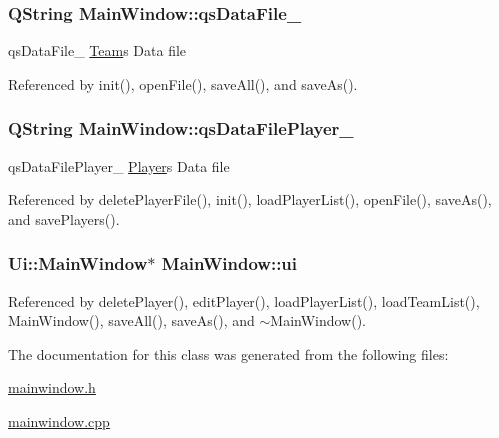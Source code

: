 \subsubsection[{qs\+Data\+File\+\_\+}]{\setlength{\rightskip}{0pt plus 5cm}Q\+String Main\+Window\+::qs\+Data\+File\+\_\+\hspace{0.3cm}{\ttfamily [private]}}\label{class_main_window_accae73696fc981f52f13a1e51b411ccb}


qs\+Data\+File\+\_\+ \hyperlink{class_team}{Team}\textquotesingle{}s Data file 



Referenced by init(), open\+File(), save\+All(), and save\+As().

\hypertarget{class_main_window_aa4336777565d0c2a9ad6f0b96bc4c004}{}
\subsubsection[{qs\+Data\+File\+Player\+\_\+}]{\setlength{\rightskip}{0pt plus 5cm}Q\+String Main\+Window\+::qs\+Data\+File\+Player\+\_\+\hspace{0.3cm}{\ttfamily [private]}}\label{class_main_window_aa4336777565d0c2a9ad6f0b96bc4c004}


qs\+Data\+File\+Player\+\_\+ \hyperlink{class_player}{Player}\textquotesingle{}s Data file 



Referenced by delete\+Player\+File(), init(), load\+Player\+List(), open\+File(), save\+As(), and save\+Players().

\hypertarget{class_main_window_a35466a70ed47252a0191168126a352a5}{}
\subsubsection[{ui}]{\setlength{\rightskip}{0pt plus 5cm}Ui\+::\+Main\+Window$\ast$ Main\+Window\+::ui\hspace{0.3cm}{\ttfamily [private]}}\label{class_main_window_a35466a70ed47252a0191168126a352a5}


Referenced by delete\+Player(), edit\+Player(), load\+Player\+List(), load\+Team\+List(), Main\+Window(), save\+All(), save\+As(), and $\sim$\+Main\+Window().



The documentation for this class was generated from the following files\+:\begin{DoxyCompactItemize}
\item 
\hyperlink{mainwindow_8h}{mainwindow.\+h}\item 
\hyperlink{mainwindow_8cpp}{mainwindow.\+cpp}\end{DoxyCompactItemize}
